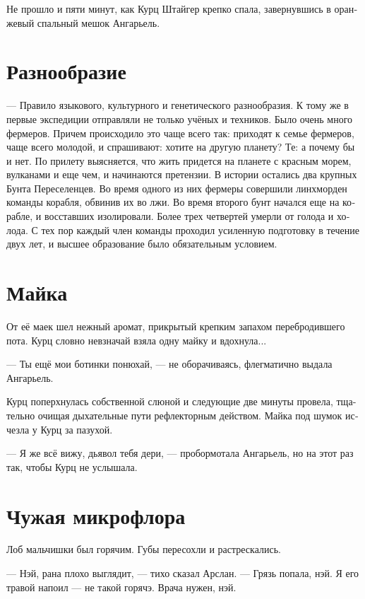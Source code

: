 \documentclass[a4paper,12pt,fleqn]{book}\usepackage{cooltooltips}\usepackage{polyglossia}\setdefaultlanguage[babelshorthands=true]{russian}\setotherlanguage{english}\defaultfontfeatures{Ligatures=TeX,Mapping=tex-text} \usepackage{xcolor}\definecolor{lightgray}{HTML}{bbbbbb}\color{lightgray}\newcommand{\ml}[3]{\textenglish{\textcolor{black}{#3}}}
\begin{document}
Не прошло и пяти минут, как Курц Штайгер крепко спала, завернувшись в оранжевый спальный мешок Ангарьель.

\section{Разнообразие}

--- Правило языкового, культурного и генетического разнообразия.
К тому же в первые экспедиции отправляли не только учёных и техников.
Было очень много фермеров.
Причем происходило это чаще всего так: приходят к семье фермеров, чаще всего молодой, и спрашивают: хотите на другую планету?
Те: а почему бы и нет.
По прилету выясняется, что жить придется на планете с красным морем, вулканами и еще чем,  и начинаются претензии.
В истории остались два крупных Бунта Переселенцев.
Во время одного из них фермеры совершили линхморден команды корабля, обвинив их во лжи.
Во время второго бунт начался еще на корабле, и восставших изолировали.
Более трех четвертей умерли от голода и холода.
С тех пор каждый член команды проходил усиленную подготовку в течение двух лет, и высшее образование было обязательным условием.

\section{Майка}

От её маек шел нежный аромат, прикрытый крепким запахом перебродившего пота.
Курц словно невзначай взяла одну майку и вдохнула...

--- Ты ещё мои ботинки понюхай, --- не оборачиваясь, флегматично выдала Ангарьель.

Курц поперхнулась собственной слюной и следующие две минуты провела, тщательно очищая дыхательные пути рефлекторным действом.
Майка под шумок исчезла у Курц за пазухой.

--- Я же всё вижу, дьявол тебя дери, --- пробормотала Ангарьель, но на этот раз так, чтобы Курц не услышала.

\section{Чужая микрофлора}

Лоб мальчишки был горячим.
Губы пересохли и растрескались.

--- Нэй, рана плохо выглядит, --- тихо сказал Арслан.
--- Грязь попала, нэй.
Я его травой напоил --- не такой горячэ.
Врача нужен, нэй.
\end{document}
